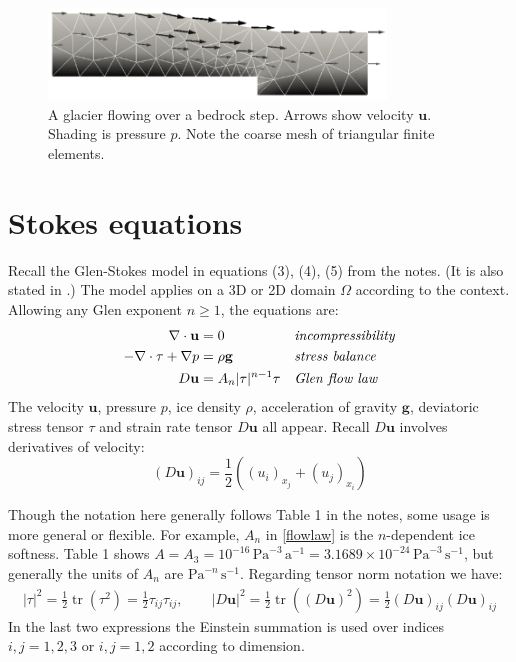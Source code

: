 \documentclass[letterpaper,final,12pt,reqno]{amsart}
\newcommand{\trace}{\operatorname{tr}}
\newcommand{\bg}{\mathbf{g}}
\newcommand{\bu}{\mathbf{u}}
\begin{document}
\begin{figure}[h]
\label{fig:stepflowlin}
\includegraphics[width=0.8\textwidth,angle=-5.7296]{stepflowlin}  %
\caption{A glacier flowing over a bedrock step.  Arrows show velocity $\bu$.  Shading is pressure $p$.  Note the coarse mesh of triangular finite elements.}
\end{figure}


\section{Stokes equations}

Recall the Glen-Stokes model in equations (3), (4), (5) from the notes.  (It is also stated in \cite{GreveBlatter2009,JouvetRappaz2011}.)  The model applies on a 3D or 2D domain $\Omega$ according to the context.  Allowing any Glen exponent $n\ge 1$, the equations are:
\begin{align}
\nabla \cdot \bu &= 0 &&\text{\emph{incompressibility}} \label{incompressible} \\
- \nabla \cdot \tau + \nabla p &= \rho \bg &&\text{\emph{stress balance}} \label{forcebalance} \\
D\bu &= A_n |\tau|^{n-1} \tau &&\text{\emph{Glen flow law}} \label{flowlaw}
\end{align}
The velocity $\bu$, pressure $p$, ice density $\rho$, acceleration of gravity $\bg$, deviatoric stress tensor $\tau$ and strain rate tensor $D\bu$ all appear.  Recall $D\bu$ involves derivatives of velocity:
\begin{equation}
(D\bu)_{ij} = \frac{1}{2} \left((u_i)_{x_j} + (u_j)_{x_i}\right) \label{strainrate}
\end{equation}

Though the notation here generally follows Table 1 in the notes, some usage is more general or flexible.  For example, $A_n$ in \eqref{flowlaw} is the $n$-dependent ice softness.  Table 1 shows $A = A_3 = 10^{-16} \,\text{Pa}^{-3}\,\text{a}^{-1} = 3.1689 \times 10^{-24} \,\text{Pa}^{-3}\,\text{s}^{-1}$, but generally the units of $A_n$ are $\text{Pa}^{-n}\,\text{s}^{-1}$.  Regarding tensor norm notation we have:
\begin{align*}
|\tau|^2 = \frac{1}{2} \trace\left(\tau^2\right) = \frac{1}{2} \tau_{ij} \tau_{ij}, \qquad |D\bu|^2 = \frac{1}{2} \trace\left((D\bu)^2\right) = \frac{1}{2} (D\bu)_{ij} (D\bu)_{ij}
\end{align*}
In the last two expressions the Einstein summation is used over indices $i,j=1,2,3$ or $i,j=1,2$ according to dimension.
\end{document}
